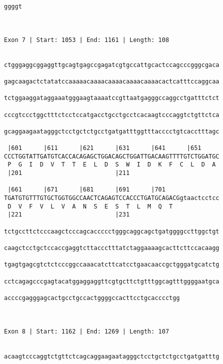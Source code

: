 \documentclass{article}
\begin{document}
\begin{Verbatim}
ggggt
     
     
 
Exon 7 | Start: 1053 | End: 1161 | Length: 108


ctgggaggcggaggttgcagtgagccgagatcgtgccattgcactccagcccgggcgaca
                                                            
gagcaagactctatatccaaaaacaaaacaaaacaaaacaaaacactcatttccaggcaa
                                                            
tctggaaggataggaaatgggaagtaaaatccgttaatgagggccaggcctgatttctct
                                                            
cccgtccctggctttctcctccatgacctgcctgcctcacaagtcccaggtctgttctca
                                                            
gcaggaagaatagggctcctgctctgcctgatgatttggtttacccctgtcacctttagc
                                                            
 |601      |611      |621      |631      |641      |651     
CCCTGGTATTGATGTCACCACAGAGCTGGACAGCTGGATTGACAAGTTTTGTCTGGATGC
 P  G  I  D  V  T  T  E  L  D  S  W  I  D  K  F  C  L  D  A 
 |201                          |211                         
  
 |661      |671      |681      |691      |701               
TGATGTGTTTGTGCTGGTGGCCAACTCAGAGTCCACCCTGATGCAGACGgtaactcctcc
 D  V  F  V  L  V  A  N  S  E  S  T  L  M  Q  T             
 |221                          |231                         
  
tctgccttctcccaagctcccagcaccccctgggcaggcagctgatggggccttggctgt
                                                            
caagctcctgctccaccgaggtcttaccctttatctaggaaaagcacttcttccacaagg
                                                            
tgagtgagcgtctctcccggccaaacatcttcatcctgaacaaccgctgggatgcatctg
                                                            
cctcagagcccgagtacatggaggaggttcgtgcttctgtttggcagtttggggaatgca
                                                            
accccgagggagcactgcctgccactggggccacttcctgcacccctgg
                                                 
                                                 
 
Exon 8 | Start: 1162 | End: 1269 | Length: 107


acaagtcccaggtctgttctcagcaggaagaatagggctcctgctctgcctgatgatttg
                                                            

\end{Verbatim}
\end{document}
